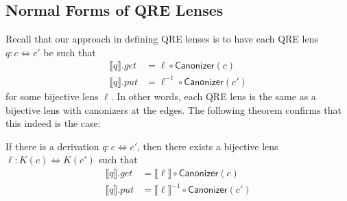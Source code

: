 \documentclass{svproc}
\newcommand{\kw}[1]{\ensuremath{\mathsf{#1}}}
\newcommand{\canonizer}{\ensuremath{\kw{Canonizer}}}
\begin{document}
\subsection{Normal Forms of QRE Lenses}
Recall that our approach in defining QRE lenses is to have each QRE lens $q: c
\Leftrightarrow c'$ be such that 
\begin{align*}
\llbracket q \rrbracket.get &= \ell \circ \canonizer(c)\\
\llbracket q \rrbracket.put &= \ell^{-1} \circ
\canonizer(c')
\end{align*}
for some bijective lens $\ell$. In other words, each QRE lens is the same as a
bijective lens with canonizers at the edges. The following theorem confirms that
this indeed is the case:

\begin{theorem}\label{normal form}
If there is a derivation $q : c \Leftrightarrow c'$, then there exists a
bijective lens $\ell : K(c) \Leftrightarrow K(c')$ such that
\begin{align*}
\llbracket q \rrbracket.get &= \llbracket \ell \rrbracket\circ \canonizer(c)\\
\llbracket q \rrbracket.put &= \llbracket \ell \rrbracket^{-1} \circ
\canonizer(c')
\end{align*}
\end{theorem}
\end{document}
